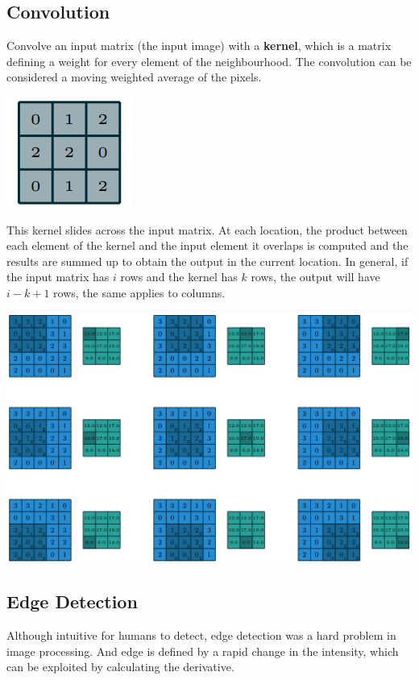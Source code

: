 \documentclass[x11names,11pt,a4paper]{article}
\theoremstyle{definition}
\begin{document}
\subsection{Convolution}
Convolve an input matrix (the input image) with a \textbf{kernel}, which is a matrix defining a weight for every element of the neighbourhood. The convolution can be considered a moving weighted average of the pixels.
\begin{center}
	\includegraphics[width=0.4\linewidth]{img/Kernel_Convolution}
\end{center}
This kernel slides across the input matrix. At each location, the product between each element of the kernel and the input element it overlaps is computed and the results are summed up to obtain the output in the current location. In general, if the input matrix has  $i$ rows and the kernel has $k$ rows, the output will have $i-k+1$ rows, the same applies to columns.
\begin{center}
	\includegraphics[width=0.8\linewidth]{img/ConvolutionOutput}
\end{center}

\subsection{Edge Detection}
Although intuitive for humans to detect, edge detection was a hard problem in image processing. And edge is defined by a rapid change in the intensity, which can be exploited by calculating the derivative.
\end{document}

